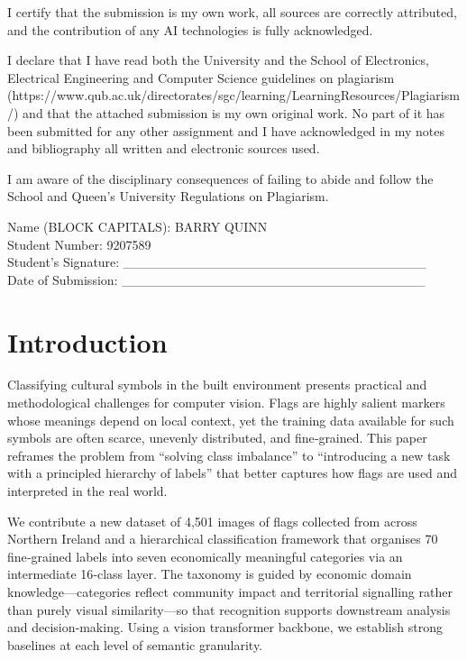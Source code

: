 \documentclass[
  a4paper,
]{article}
\begin{document}
I certify that the submission is my own work, all sources are correctly
attributed, and the contribution of any AI technologies is fully
acknowledged.

I declare that I have read both the University and the School of
Electronics, Electrical Engineering and Computer Science guidelines on
plagiarism
(https://www.qub.ac.uk/directorates/sgc/learning/LearningResources/Plagiarism/)
and that the attached submission is my own original work. No part of it
has been submitted for any other assignment and I have acknowledged in
my notes and bibliography all written and electronic sources used.

I am aware of the disciplinary consequences of failing to abide and
follow the School and Queen's University Regulations on Plagiarism.

Name (BLOCK CAPITALS): BARRY QUINN\\
Student Number: 9207589\\
Student's Signature:
\_\_\_\_\_\_\_\_\_\_\_\_\_\_\_\_\_\_\_\_\_\_\_\_\_\_\_\_\_\_\_\_\\
Date of Submission:
\_\_\_\_\_\_\_\_\_\_\_\_\_\_\_\_\_\_\_\_\_\_\_\_\_\_\_\_\_\_\_\_

\newpage

\section{Introduction}\label{introduction}

Classifying cultural symbols in the built environment presents practical
and methodological challenges for computer vision. Flags are highly
salient markers whose meanings depend on local context, yet the training
data available for such symbols are often scarce, unevenly distributed,
and fine‑grained. This paper reframes the problem from ``solving class
imbalance'' to ``introducing a new task with a principled hierarchy of
labels'' that better captures how flags are used and interpreted in the
real world.

We contribute a new dataset of 4,501 images of flags collected from
across Northern Ireland and a hierarchical classification framework that
organises 70 fine‑grained labels into seven economically meaningful
categories via an intermediate 16‑class layer. The taxonomy is guided by
economic domain knowledge---categories reflect community impact and
territorial signalling rather than purely visual similarity---so that
recognition supports downstream analysis and decision‑making. Using a
vision transformer backbone, we establish strong baselines at each level
of semantic granularity.
\end{document}
